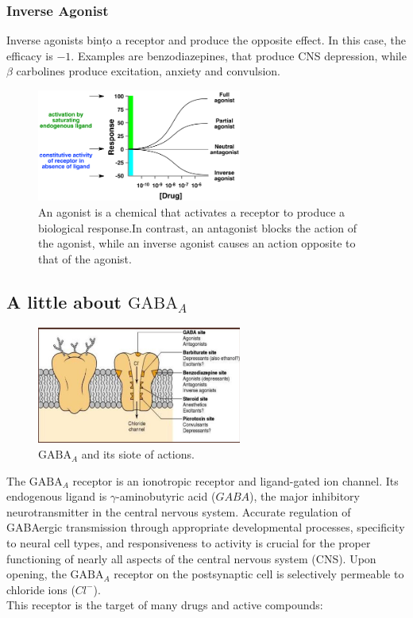 \documentclass{book}
\begin{document}
\subsubsection{Inverse Agonist}
Inverse agonists bin\d to a receptor and produce the opposite effect.
In this case, the efficacy is $-1$.
Examples are benzodiazepines, that produce CNS depression, while $\beta$ carbolines produce excitation, anxiety and convulsion.

\begin{figure}[H]
    \includegraphics[width=0.6\textwidth, center]{images/image19.png}
    \caption{An agonist is a chemical that activates a receptor to produce a biological response.In contrast, an antagonist blocks the action of the agonist, while an inverse agonist causes an action opposite to that of the agonist.}
\end{figure}


\subsection{A little about $\text{GABA}_A$}
\begin{figure}[H]
    \includegraphics[width=0.6\textwidth, center]{images/image20.png}
    \caption{$\text{GABA}_A$ and its siote of actions.}
\end{figure}
The $\text{GABA}_A$ receptor is an ionotropic receptor and ligand-gated ion channel. 
Its endogenous ligand is $\gamma$-aminobutyric acid ($GABA$), the major inhibitory neurotransmitter in the central nervous system. 
Accurate regulation of GABAergic transmission through appropriate developmental processes, specificity to neural cell types, and responsiveness to activity is crucial for the proper functioning of nearly all aspects of the central nervous system (CNS).
Upon opening, the $\text{GABA}_A$ receptor on the postsynaptic cell is selectively permeable to chloride ions ($Cl^-$). 
\\
This receptor is the target of many drugs and active compounds:
\end{document}
